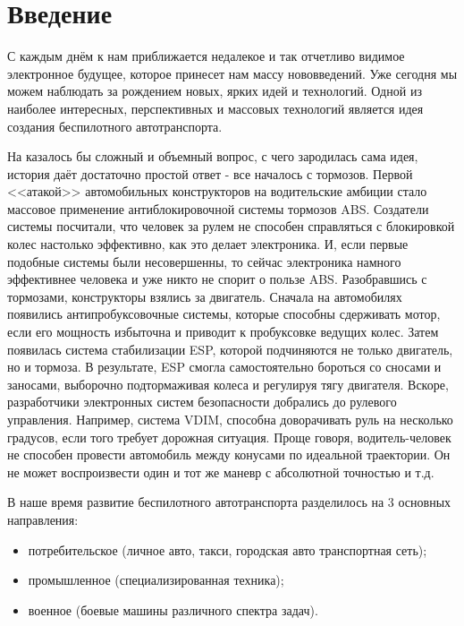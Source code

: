 \chapter*{Введение}							%

С каждым днём к нам приближается недалекое и так отчетливо видимое 
электронное будущее, которое принесет нам массу нововведений. Уже сегодня мы 
можем наблюдать за рождением новых, ярких идей и технологий. Одной из наиболее
интересных, перспективных и массовых технологий является идея создания 
беспилотного автотранспорта.


На казалось бы сложный и объемный вопрос, с чего зародилась сама идея, история 
даёт достаточно простой ответ - все началось с тормозов. Первой <<атакой>> 
автомобильных конструкторов на водительские амбиции стало массовое применение 
антиблокировочной системы тормозов ABS. Создатели системы посчитали, что 
человек за рулем не способен справляться с блокировкой колес настолько 
эффективно, как это делает электроника. И, если первые подобные системы были 
несовершенны, то сейчас электроника намного эффективнее человека и уже никто 
не спорит о пользе ABS. Разобравшись с тормозами, конструкторы взялись за 
двигатель. Сначала на автомобилях появились антипробуксовочные системы, 
которые способны сдерживать мотор, если его мощность избыточна и приводит 
к пробуксовке ведущих колес. Затем появилась система стабилизации ESP, 
которой подчиняются не только двигатель, но и тормоза. В результате, 
ESP смогла самостоятельно бороться со сносами и заносами, выборочно 
подтормаживая колеса и регулируя тягу двигателя. Вскоре, разработчики 
электронных систем безопасности добрались до рулевого управления. 
Например, система VDIM, 
способна доворачивать руль на несколько градусов, если того требует дорожная 
ситуация. Проще говоря, водитель-человек не способен провести автомобиль между 
конусами по идеальной траектории. Он не может воспроизвести один и тот же 
маневр с абсолютной точностью и т.д.

В наше время развитие беспилотного автотранспорта разделилось на 3 основных 
направления:

\begin{itemize}
    \item потребительское (личное авто, такси, городская авто транспортная сеть);
    \item промышленное (специализированная техника);
    \item военное (боевые машины различного спектра задач).
  \end{itemize}

